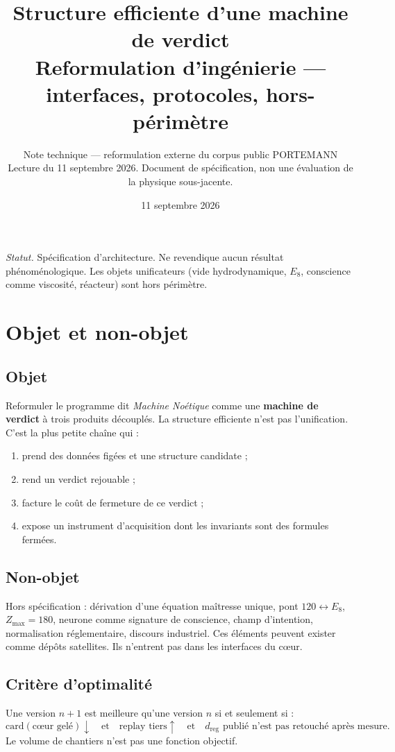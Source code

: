 \documentclass[11pt,a4paper]{article}
\title{\sffamily\bfseries Structure efficiente d'une machine de verdict\\[0.35em]
\large Reformulation d'ingénierie --- interfaces, protocoles, hors-périmètre}
\author{Note technique --- reformulation externe du corpus public PORTEMANN\\
\normalsize Lecture du 11 septembre 2026. Document de spécification, non une évaluation de la physique sous-jacente.}
\date{11 septembre 2026}
\theoremstyle{definition}
\begin{document}
\maketitle
\vspace{-1.2em}
\noindent\textit{Statut.} Spécification d'architecture. Ne revendique aucun résultat phénoménologique. Les objets unificateurs (vide hydrodynamique, \(E_8\), conscience comme viscosité, réacteur) sont hors périmètre.

\tableofcontents
\vspace{0.6em}

\section{Objet et non-objet}

\subsection{Objet}
Reformuler le programme dit \emph{Machine Noétique} comme une \textbf{machine de verdict} à trois produits découplés. La structure efficiente n'est pas l'unification. C'est la plus petite chaîne qui :
\begin{enumerate}
  \item prend des données figées et une structure candidate ;
  \item rend un verdict rejouable ;
  \item facture le coût de fermeture de ce verdict ;
  \item expose un instrument d'acquisition dont les invariants sont des formules fermées.
\end{enumerate}

\subsection{Non-objet}
Hors spécification : dérivation d'une équation maîtresse unique, pont \(120\leftrightarrow E_8\), \(Z_{\max}=180\), neurone comme signature de conscience, champ d'intention, normalisation réglementaire, discours industriel. Ces éléments peuvent exister comme dépôts satellites. Ils n'entrent pas dans les interfaces du cœur.

\subsection{Critère d'optimalité}
Une version \(n+1\) est meilleure qu'une version \(n\) si et seulement si :
\begin{equation}
  \text{card}(\text{cœur gelé}) \downarrow
  \quad\text{et}\quad
  \text{replay tiers} \uparrow
  \quad\text{et}\quad
  d_{\mathrm{reg}} \text{ publié n'est pas retouché après mesure.}
\end{equation}
Le volume de chantiers n'est pas une fonction objectif.
\end{document}
